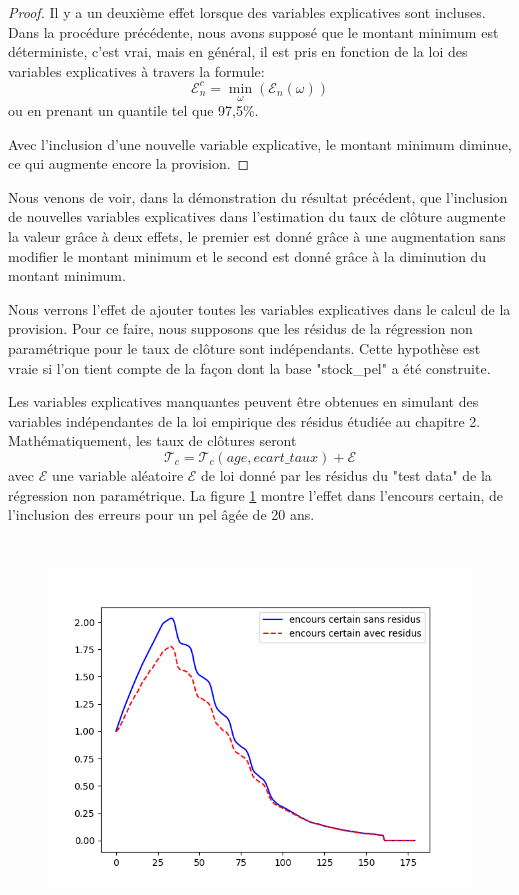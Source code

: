 \documentclass[12pt, a4paper]{book}
\newcommand{\Tc}{\mathcal{T}_c}
\newcommand{\E}{\mathcal{E}}
\begin{document}
{\begin{proof}
Il y a un deuxième effet lorsque des variables explicatives sont incluses. Dans la procédure précédente, nous avons supposé que le montant minimum est déterministe, c'est vrai, mais en général, il est pris en fonction de la loi des variables explicatives à travers la formule:
$$\E_n^c = \min_\omega(\E_n(\omega))  $$
 ou en prenant un quantile tel que 97,5\%. 

Avec l'inclusion d'une nouvelle variable explicative, le montant minimum diminue, ce qui augmente encore la provision.
\end{proof}

Nous venons de voir, dans la démonstration du résultat précédent, que l'inclusion de nouvelles variables explicatives dans l'estimation du taux de clôture augmente la valeur grâce à deux effets, le premier est donné grâce à une augmentation sans modifier le montant minimum et le second est donné grâce à la diminution du montant minimum.

Nous verrons l'effet de ajouter toutes les variables explicatives dans le calcul de la provision. Pour ce faire, nous supposons que les résidus de la régression non paramétrique pour le taux de clôture sont indépendants. Cette hypothèse est vraie si l'on tient compte de la façon dont la base "stock\_pel" a été construite. 

Les variables explicatives manquantes peuvent être obtenues en simulant des variables indépendantes de la loi empirique des résidus étudiée au chapitre 2. Mathématiquement, les taux de clôtures seront 
$$\Tc = \Tc(age,ecart\_taux)+ \E$$
avec $\E$ une variable aléatoire $\E$ de loi donné par les résidus du "test data" de la régression non paramétrique. La figure \ref{encours_min_sr_vs_r} montre l'effet dans l'encours certain, de l'inclusion des erreurs pour un pel âgée de 20 ans.



\begin{figure}[!h]
\label{encours_min_sr_vs_r}
\centering
\includegraphics[height=10cm,width=16cm]{encours_min_sr_vs_r.png}
\end{figure}

}
\end{document}
